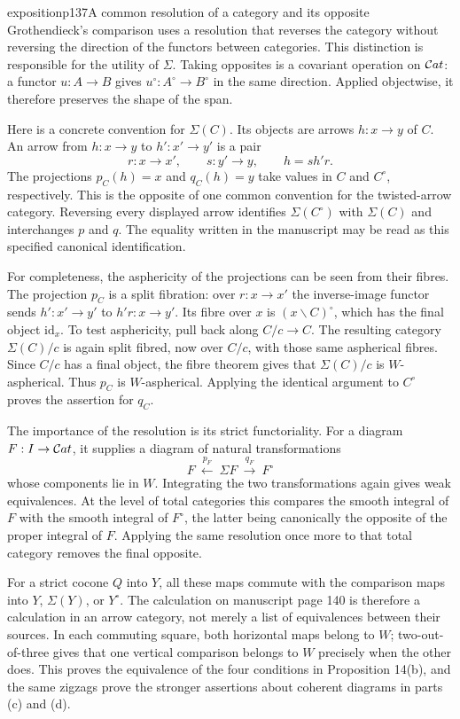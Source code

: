 \begin{dcomment}{exposition}{p137}{A common resolution of a category and its opposite}
Grothendieck's comparison uses a resolution that reverses the category without reversing the direction of the functors between categories. This distinction is responsible for the utility of $\Sigma$. Taking opposites is a covariant operation on $\mathcal{C}at$: a functor $u:A\to B$ gives $u^\circ:A^\circ\to B^\circ$ in the same direction. Applied objectwise, it therefore preserves the shape of the span.

Here is a concrete convention for $\Sigma(C)$. Its objects are arrows $h:x\to y$ of $C$. An arrow from $h:x\to y$ to $h':x'\to y'$ is a pair
\[
 r:x\to x',\qquad s:y'\to y,
 \qquad h=s h'r.
\]
The projections $p_C(h)=x$ and $q_C(h)=y$ take values in $C$ and $C^\circ$, respectively. This is the opposite of one common convention for the twisted-arrow category. Reversing every displayed arrow identifies $\Sigma(C^\circ)$ with $\Sigma(C)$ and interchanges $p$ and $q$. The equality written in the manuscript may be read as this specified canonical identification.

For completeness, the asphericity of the projections can be seen from their fibres. The projection $p_C$ is a split fibration: over $r:x\to x'$ the inverse-image functor sends $h':x'\to y'$ to $h'r:x\to y'$. Its fibre over $x$ is $(x\backslash C)^\circ$, which has the final object $\mathrm{id}_x$. To test asphericity, pull back along $C/c\to C$. The resulting category $\Sigma(C)/c$ is again split fibred, now over $C/c$, with those same aspherical fibres. Since $C/c$ has a final object, the fibre theorem gives that $\Sigma(C)/c$ is $W$-aspherical. Thus $p_C$ is $W$-aspherical. Applying the identical argument to $C^\circ$ proves the assertion for $q_C$.

The importance of the resolution is its strict functoriality. For a diagram $F:I\to\mathcal{C}at$, it supplies a diagram of natural transformations
\[
 F\ \xleftarrow{p_F}\ \Sigma F\ \xrightarrow{q_F}\ F^\circ
\]
whose components lie in $W$. Integrating the two transformations again gives weak equivalences. At the level of total categories this compares the smooth integral of $F$ with the smooth integral of $F^\circ$, the latter being canonically the opposite of the proper integral of $F$. Applying the same resolution once more to that total category removes the final opposite.

For a strict cocone $Q$ into $Y$, all these maps commute with the comparison maps into $Y$, $\Sigma(Y)$, or $Y^\circ$. The calculation on manuscript page 140 is therefore a calculation in an arrow category, not merely a list of equivalences between their sources. In each commuting square, both horizontal maps belong to $W$; two-out-of-three gives that one vertical comparison belongs to $W$ precisely when the other does. This proves the equivalence of the four conditions in Proposition 14(b), and the same zigzags prove the stronger assertions about coherent diagrams in parts (c) and (d).


\end{dcomment}
